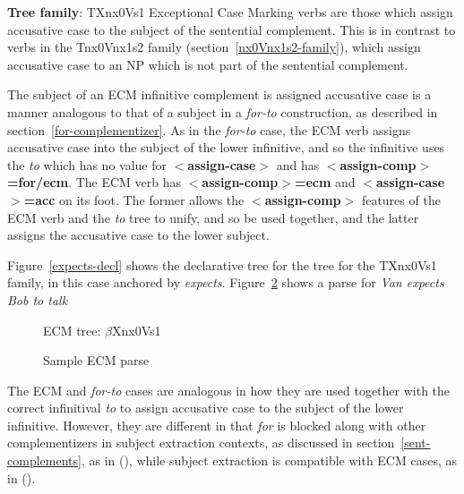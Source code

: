 {\bf Tree family}: TXnx0Vs1
Exceptional Case Marking verbs are those which assign accusative case to the
subject of the sentential complement. This is in contrast to verbs
in the Tnx0Vnx1s2 family (section~\ref{nx0Vnx1s2-family}), which assign 
accusative case to an NP which is not part of the sentential complement.  

The subject of an ECM infinitive
complement is assigned accusative case is a manner
analogous to that of a subject in a {\it for-to\/} construction, as described
in section~\ref{for-complementizer}.  As in the {\it for-to\/} case, the
ECM verb assigns accusative case into the subject of the lower infinitive, and
so the infinitive uses the {\it to} which has no value for
{\bf $<$assign-case$>$} and has {\bf $<$assign-comp$>$=for/ecm}.  The ECM verb
has {\bf $<$assign-comp$>$=ecm} and {\bf $<$assign-case$>$=acc} on its
foot.  The former allows the {\bf $<$assign-comp$>$} features of the ECM
verb and the {\it to} tree to unify, and so be used together, and the latter
assigns the accusative case to the lower subject.  

Figure~\ref{expects-decl} shows the 
declarative tree for the 
tree for the TXnx0Vs1 family, in this case anchored by {\it expects}.
Figure~\ref{van-expects} shows a parse for {\it Van expects Bob to talk}

\begin{figure}[hbt]
\centering
\hspace{0.0in}
\caption{ECM tree: $\beta$Xnx0Vs1}
\label{expects-decl}
\label{3;1,15}
\end{figure}

\begin{figure}[hbt]
\centering
\hspace{0.0in}
\caption{Sample ECM parse}
\label{van-expects}
\end{figure}

The ECM and {\it for-to\/} cases are analogous in how they are used together
with the correct infinitival {\it to} to assign accusative case to the 
subject of the lower infinitive.  However, they are different in that
{\it for} is blocked along with other complementizers in subject extraction
contexts, as discussed in section~\ref{sent-complements}, as in
(), while subject extraction is compatible with ECM cases, 
as in ().


